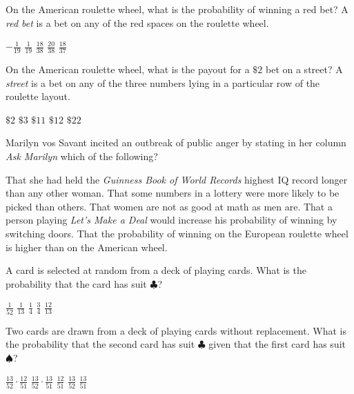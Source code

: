 \documentclass[answers,12pt]{exam}
\begin{document}
\begin{questions}
\question On the American roulette wheel,
what is the probability of winning a
red bet? A {\em red bet} is a bet on any of the red spaces
on the roulette wheel.\\
\begin{oneparchoices}
\choice $-\frac{1}{19}$
\choice $\frac{1}{19}$
\choice $\frac{18}{38}$
\choice $\frac{20}{38}$
\correctchoice $\frac{18}{37}$
\end{oneparchoices}

\question On the American roulette wheel, what is the payout
for a $\$2$ bet on a street? A {\em street} is a bet
on any of the three numbers lying in a particular
row of the roulette layout.\\
\begin{oneparchoices}
\choice $\$2$
\choice $\$3$
\choice $\$11$
\choice $\$12$
\correctchoice $\$22$
\end{oneparchoices}

\question Marilyn vos Savant incited an outbreak of public
anger by stating in her column {\em Ask Marilyn} which
of the following?\\
\begin{choices}
\choice That she had held the {\em Guinness Book of World Records}
highest IQ record longer than any other woman.
\choice That some numbers in a lottery were more
likely to be picked than others.
\choice That women are not as good at math as men are.
\correctchoice That a person playing {\em Let's Make a Deal}
would increase his probability of winning by switching doors.
\choice That the probability of winning on the European
roulette wheel is higher than on the American wheel.
\end{choices}

\question A card is selected at random from a deck of
playing cards. What is the probability that
the card has suit $\clubsuit$?\\
\begin{oneparchoices}
\choice $\frac{1}{52}$
\choice $\frac{1}{13}$
\correctchoice $\frac{1}{4}$
\choice $\frac{3}{4}$
\choice $\frac{12}{13}$
\end{oneparchoices}

\question Two cards are drawn from a deck of playing cards
without replacement. What is the probability that
the second card has suit $\clubsuit$ given that the
first card has suit $\spadesuit$?\\
\begin{oneparchoices}
\choice $\frac{13}{52}\cdot\frac{12}{51}$
\choice $\frac{13}{52}\cdot\frac{13}{51}$
\choice $\frac{12}{51}$
\choice $\frac{13}{52}$
\correctchoice $\frac{13}{51}$
\end{oneparchoices}


\end{questions}
\end{document}

